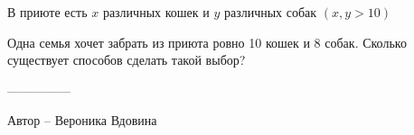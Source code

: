 \question
В приюте есть $x$ различных кошек и $y$ различных собак $(x, y>10)$

Одна семья хочет забрать из приюта ровно 10 кошек и 8 собак. Сколько существует способов сделать такой выбор?

---------------

Автор -- Вероника Вдовина
